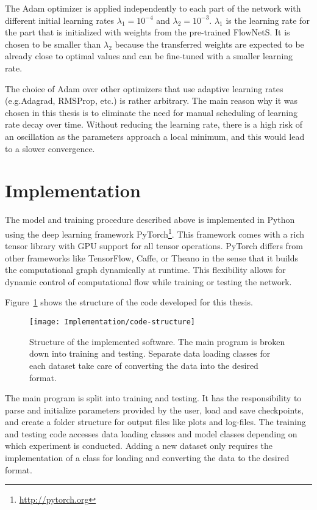		The Adam optimizer is applied independently to each part of the network with different initial learning rates
		$\lambda_1 = 10^{-4}$ and $\lambda_2 = 10^{-3}$.
		$\lambda_1$ is the learning rate for the part that is initialized with weights from the pre-trained FlowNetS.
		It is chosen to be smaller than $\lambda_2$ because the transferred weights are expected to be already close to optimal values and can be fine-tuned with a smaller learning rate.
		
		The choice of Adam over other optimizers that use adaptive learning rates (e.g.\@ Adagrad, RMSProp, etc.) is rather arbitrary.
		The main reason why it was chosen in this thesis is to eliminate the need for manual scheduling of learning rate decay over time.
		Without reducing the learning rate, there is a high risk of an oscillation as the parameters approach a local minimum, and this would lead to a slower convergence.

	\section{Implementation}
		The model and training procedure described above is implemented in Python using the deep learning framework PyTorch\footnote{\url{http://pytorch.org}}.
		This framework comes with a rich tensor library with GPU support for all tensor operations. 
		PyTorch differs from other frameworks like TensorFlow, Caffe, or Theano in the sense that it builds the computational graph dynamically at runtime.
		This flexibility allows for dynamic control of computational flow while training or testing the network.
		
		Figure~\ref{fig:code-structure} shows the structure of the code developed for this thesis.
		\begin{figure}[t]
			\centering
			\texttt{[image: Implementation/code-structure]}
			\caption[Structure of the implemented software]
					{Structure of the implemented software.
					 The main program is broken down into training and testing.
					 Separate data loading classes for each dataset take care of converting the data into the desired format.}
			\label{fig:code-structure}
		\end{figure}
		The main program is split into training and testing.
		It has the responsibility to parse and initialize parameters provided by the user, load and save checkpoints, and create a folder structure for output files like plots and log-files.
		The training and testing code accesses data loading classes and model classes depending on which experiment is conducted.
		Adding a new dataset only requires the implementation of a class for loading and converting the data to the desired format.